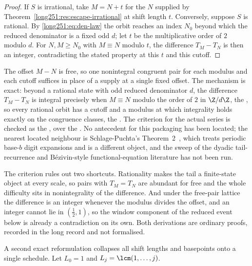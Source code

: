 \begin{proof}
If $S$ is irrational, take $M=N+t$ for the $N$ supplied by
Theorem~\ref{long251:res:escape-irrational} at shift length $t$.  Conversely, suppose
$S$ is rational.  By \eqref{long251:eq:den-law} the orbit reaches an index $N_0$ beyond
which the reduced denominator is a fixed odd $d$; let $t$ be the
multiplicative order of $2$ modulo $d$.  For $N,M\ge N_0$ with $M\equiv N$
modulo $t$, the difference $T_M-T_N$ is then an integer, contradicting the
stated property at this $t$ and this cutoff.
\end{proof}

\noindent The offset $M-N$ is free, so one nonintegral congruent pair for each
modulus and each cutoff suffices in place of a supply at a single fixed offset.
The mechanism is exact: beyond a rational state with odd reduced denominator
$d$, the difference $T_M-T_N$ is integral precisely when $M\equiv N$ modulo the
order of $2$ in $\Z/d\Z$, the
, so every rational orbit has a cutoff and a modulus at which
integrality holds exactly on the congruence classes, the
.  The criterion for the actual series is checked as the
, over the
.  No antecedent for this packaging has been located; the
nearest located neighbour is Schlage-Puchta's
Theorem~2~\cite{schlagepuchta2011}, which treats periodic base-$b$ digit
expansions and is a different object, and the sweep of the dyadic
tail-recurrence and B\'ezivin-style functional-equation literature has not been
run.

The criterion rules out two shortcuts.  Rationality makes the tail a
finite-state object at every scale, so pairs with $T_M=T_N$ are abundant for
free and the whole difficulty sits in nonintegrality of the difference.  And
under the free-pair lattice the difference is an integer whenever the modulus
divides the offset, and an integer cannot lie in $(\tfrac12,1)$, so the window
component of the reduced event below is already a contradiction on its own.
Both derivations are ordinary proofs, recorded in the long record and not
formalised.

A second exact reformulation collapses all shift lengths and basepoints onto a
single schedule.  Let $L_0=1$ and $L_j=\lcm(1,\ldots,j)$.

